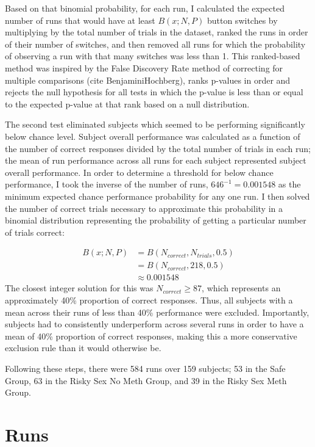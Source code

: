 \documentclass[]{article}
\begin{document}
Based on that binomial probability, for each run, I calculated the
expected number of runs that would have at least \(B(x; N, P)\) button
switches by multiplying by the total number of trials in the dataset,
ranked the runs in order of their number of switches, and then removed
all runs for which the probability of observing a run with that many
switches was less than 1. This ranked-based method was inspired by the
False Discovery Rate method of correcting for multiple comparisons (cite
BenjaminiHochberg), ranks p-values in order and rejects the null
hypothesis for all tests in which the p-value is less than or equal to
the expected p-value at that rank based on a null distribution.

The second test eliminated subjects which seemed to be performing
significantly below chance level. Subject overall performance was
calculated as a function of the number of correct responses divided by
the total number of trials in each run; the mean of run performance
across all runs for each subject represented subject overall
performance. In order to determine a threshold for below chance
performance, I took the inverse of the number of runs,
\(646^{-1}=0.001548\) as the minimum expected chance performance
probability for any one run. I then solved the number of correct trials
necessary to approximate this probability in a binomial distribution
representing the probability of getting a particular number of trials
correct:

\[
\begin{aligned}
B(x; N, P) &= B(N_{correct},N_{trials},0.5) \\
  &= B(N_{correct},218,0.5) \\
  &\approx0.001548
\end{aligned}
\] The closest integer solution for this was \(N_{correct}\geq 87\),
which represents an approximately 40\% proportion of correct responses.
Thus, all subjects with a mean across their runs of less than 40\%
performance were excluded. Importantly, subjects had to consistently
underperform across several runs in order to have a mean of 40\%
proportion of correct responses, making this a more conservative
exclusion rule than it would otherwise be.

Following these steps, there were 584 runs over 159 subjects; 53 in the
Safe Group, 63 in the Risky Sex No Meth Group, and 39 in the Risky Sex
Meth Group.

\section{Runs}\label{runs}
\end{document}
